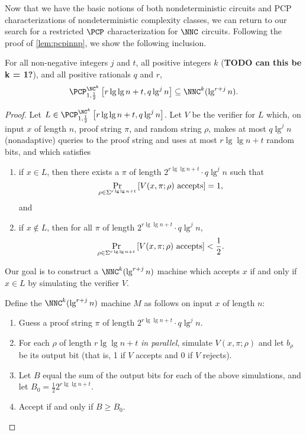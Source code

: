 \documentclass[]{article}
\newcommand{\PCPcs}[5]{\PCP^{#1}_{#2, #3}\left[#4, #5\right]}
\begin{document}
Now that we have the basic notions of both nondeterministic circuits and PCP characterizations of nondeterministic complexity classes, we can return to our search for a restricted $\PCP$ characterization for $\NNC$ circuits.
Following the proof of \autoref{lem:pcpinnp}, we show the following inclusion.
\begin{proposition}\label{prop:pcpinnnc}
  For all non-negative integers $j$ and $t$, all positive integers $k$ (\textbf{TODO can this be k = 1?}), and all positive rationals $q$ and $r$,
  \begin{equation*}
    \PCPcs{\NC^k}{1}{\frac{1}{2}}{r \lg \lg n + t}{q \lg^j n} \subseteq \NNC^k(\lg^{r + j} n).
  \end{equation*}
\end{proposition}
\begin{proof}
  Let $L \in \PCPcs{\NC^k}{1}{\frac{1}{2}}{r \lg \lg n + t}{q \lg^j n}$.
  Let $V$ be the \PCP{} verifier for $L$ which, on input $x$ of length $n$, proof string $\pi$, and random string $\rho$, makes at most $q \lg^j n$ (nonadaptive) queries to the proof string and uses at most $r \lg \lg n + t$ random bits, and which satisfies
  \begin{enumerate}
  \item if $x \in L$, then there exists a $\pi$ of length $2^{r \lg \lg n + t} \cdot q \lg^j n$ such that
    \begin{equation*}
      \Pr_{\rho \in \Sigma^{r \lg \lg n + t}}{\left[V(x, \pi; \rho) \textnormal{ accepts}\right]} = 1,
    \end{equation*}
    and
  \item if $x \notin L$, then for all $\pi$ of length $2^{r \lg \lg n + t} \cdot q \lg^j n$,
    \begin{equation*}
      \Pr_{\rho \in \Sigma^{r \lg \lg n + t}}{\left[V(x, \pi; \rho) \textnormal{ accepts}\right]} < \frac{1}{2}.
    \end{equation*}
  \end{enumerate}
  Our goal is to construct a $\NNC^k(\lg^{r + j} n)$ machine which accepts $x$ if and only if $x \in L$ by simulating the \PCP{} verifier $V$.

  Define the $\NNC^k(\lg^{r + j} n)$ machine $M$ as follows on input $x$ of length $n$:
  \begin{enumerate}
  \item Guess a proof string $\pi$ of length $2^{r \lg \lg n + t} \cdot q \lg^j n$.
  \item For each $\rho$ of length $r \lg \lg n + t$ \emph{in parallel}, simulate $V(x, \pi; \rho)$ and let $b_\rho$ be its output bit (that is, 1 if $V$ accepts and 0 if $V$ rejects).
  \item Let $B$ equal the sum of the output bits for each of the above simulations, and let $B_0 = \frac{1}{2} 2^{r \lg \lg n + t}$.
  \item Accept if and only if $B \geq B_0$.
  \end{enumerate}


\end{proof}
\end{document}

